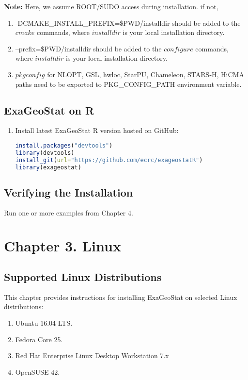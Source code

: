 \documentclass[
10pt, %
a4paper, %
oneside, %
headinclude,footinclude, %
BCOR5mm, %
]{scrartcl}
\begin{document}
\begin{shaded}
{\textbf {Note:}} Here, we assume ROOT/SUDO access during installation. if not, 
\begin{enumerate}
\item -DCMAKE\_INSTALL\_PREFIX=\$PWD/installdir should be added to the $cmake$ commands, where $installdir$ is your local installation directory.
\item --prefix=\$PWD/installdir should be added to the $configure$ commands, where $installdir$ is your local installation directory.
\item  $pkgconfig$ for NLOPT, GSL, hwloc, StarPU, Chameleon, STARS-H, HiCMA paths need to be exported to PKG\_CONFIG\_PATH environment variable.
\end{enumerate}
\end{shaded}

\subsection{ExaGeoStat on R}
\begin{enumerate}
\item
\noindent Install latest ExaGeoStat R version hosted on GitHub:
\begin{lstlisting}[language=R]
install.packages("devtools")
library(devtools)
install_git(url="https://github.com/ecrc/exageostatR")
library(exageostat)
\end{lstlisting}


\end{enumerate}


\subsection{Verifying the Installation}
Run one or more examples from Chapter 4.


\section{Chapter 3. Linux}
\subsection{Supported Linux Distributions}
This chapter provides instructions for installing ExaGeoStat on selected Linux distributions:
\begin{enumerate}
\item Ubuntu 16.04 LTS.
\item  Fedora Core 25.
\item Red Hat Enterprise Linux Desktop Workstation 7.x
\item  OpenSUSE 42.

\end{enumerate}
\end{document}
